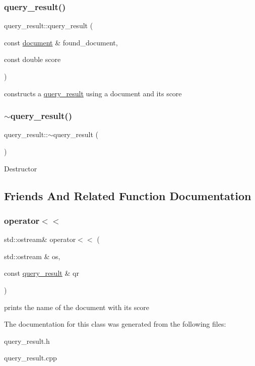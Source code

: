 \subsubsection{\texorpdfstring{query\+\_\+result()}{query\_result()}}
{\footnotesize\ttfamily query\+\_\+result\+::query\+\_\+result (\begin{DoxyParamCaption}\item[{const \hyperlink{classdocument}{document} \&}]{found\+\_\+document,  }\item[{const double}]{score }\end{DoxyParamCaption})}

constructs a \hyperlink{classquery__result}{query\+\_\+result} using a document and its score \mbox{\label{classquery__result_a85eee76ed372ad28ab7347053633714a}} 
\subsubsection{\texorpdfstring{$\sim$query\+\_\+result()}{~query\_result()}}
{\footnotesize\ttfamily query\+\_\+result\+::$\sim$query\+\_\+result (\begin{DoxyParamCaption}{ }\end{DoxyParamCaption})}

Destructor 

\subsection{Friends And Related Function Documentation}
\mbox{\label{classquery__result_aa97ddcf5d38eaf8c7160b9fe609170f5}} 
\subsubsection{\texorpdfstring{operator$<$$<$}{operator<<}}
{\footnotesize\ttfamily std\+::ostream\& operator$<$$<$ (\begin{DoxyParamCaption}\item[{std\+::ostream \&}]{os,  }\item[{const \hyperlink{classquery__result}{query\+\_\+result} \&}]{qr }\end{DoxyParamCaption})\hspace{0.3cm}{\ttfamily [friend]}}

prints the name of the document with its score 

The documentation for this class was generated from the following files\+:\begin{DoxyCompactItemize}
\item 
query\+\_\+result.\+h\item 
query\+\_\+result.\+cpp\end{DoxyCompactItemize}
